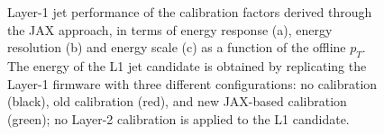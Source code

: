 \begin{figure}
    \centering
    
    \caption{Layer-1 jet performance of the calibration factors derived through the JAX approach, in terms of energy response (a), energy resolution (b) and energy scale (c) as a function of the offline $p_T$. The energy of the L1 jet candidate is obtained by replicating the Layer-1 firmware with three different configurations: no calibration (black), old calibration (red), and new JAX-based calibration (green); no Layer-2 calibration is applied to the L1 candidate.}
    \label{fig:JAX_HCAL_Response}
\end{figure}

